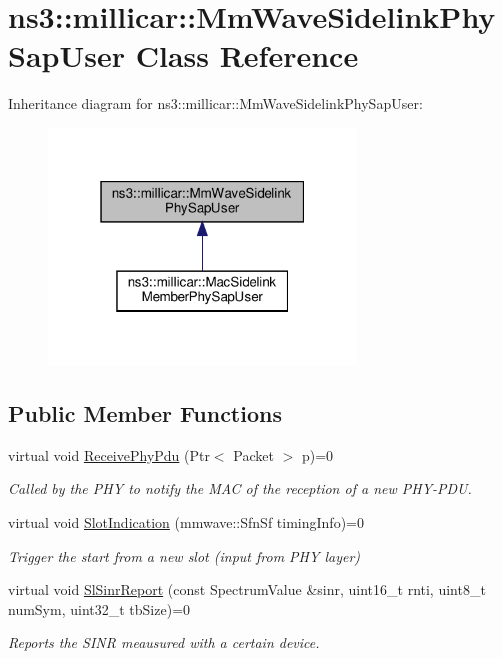 \hypertarget{classns3_1_1millicar_1_1MmWaveSidelinkPhySapUser}{}\section{ns3\+:\+:millicar\+:\+:Mm\+Wave\+Sidelink\+Phy\+Sap\+User Class Reference}
\label{classns3_1_1millicar_1_1MmWaveSidelinkPhySapUser}


Inheritance diagram for ns3\+:\+:millicar\+:\+:Mm\+Wave\+Sidelink\+Phy\+Sap\+User\+:\nopagebreak
\begin{figure}[H]
\begin{center}
\leavevmode
\includegraphics[width=232pt]{classns3_1_1millicar_1_1MmWaveSidelinkPhySapUser__inherit__graph}
\end{center}
\end{figure}
\subsection*{Public Member Functions}
\begin{DoxyCompactItemize}
\item 
virtual void \hyperlink{classns3_1_1millicar_1_1MmWaveSidelinkPhySapUser_ac0e4d40ace55e47cb3fb54d09c80fe06}{Receive\+Phy\+Pdu} (Ptr$<$ Packet $>$ p)=0
\begin{DoxyCompactList}\small\item\em Called by the P\+HY to notify the M\+AC of the reception of a new P\+H\+Y-\/\+P\+DU. \end{DoxyCompactList}\item 
virtual void \hyperlink{classns3_1_1millicar_1_1MmWaveSidelinkPhySapUser_a237ec6c8c7496a3e021d22393ba7fc61}{Slot\+Indication} (mmwave\+::\+Sfn\+Sf timing\+Info)=0
\begin{DoxyCompactList}\small\item\em Trigger the start from a new slot (input from P\+HY layer) \end{DoxyCompactList}\item 
virtual void \hyperlink{classns3_1_1millicar_1_1MmWaveSidelinkPhySapUser_aedb96411ce5a46589df517b1aa272d97}{Sl\+Sinr\+Report} (const Spectrum\+Value \&sinr, uint16\+\_\+t rnti, uint8\+\_\+t num\+Sym, uint32\+\_\+t tb\+Size)=0
\begin{DoxyCompactList}\small\item\em Reports the S\+I\+NR meausured with a certain device. \end{DoxyCompactList}\end{DoxyCompactItemize}


